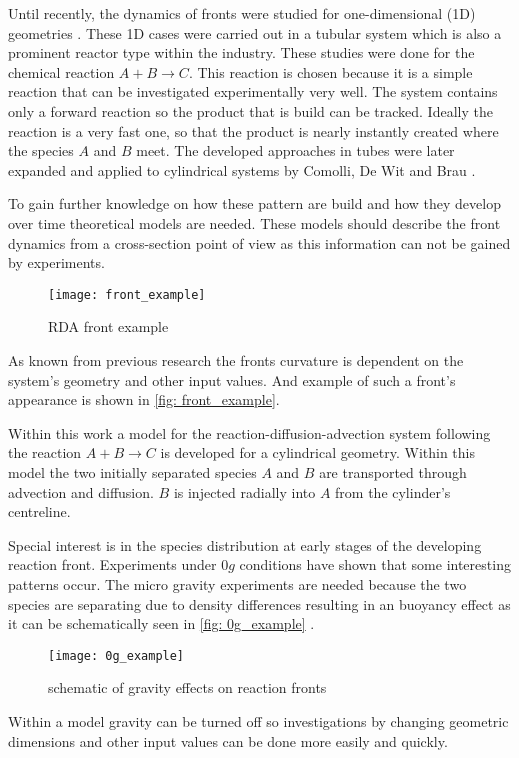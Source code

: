 \documentclass[../thesis.tex]{subfiles}
\begin{document}
Until recently, the dynamics of fronts were studied for one-dimensional (1D) geometries \cite{PhysRevA.38.3151}. These 1D cases were carried out in a tubular system which is also a prominent reactor type within the industry. These studies were done for the chemical reaction $ A+B \rightarrow C$. This reaction is chosen because it is a simple reaction that can be investigated experimentally very well. The system contains only a forward reaction so the product that is build can be tracked. Ideally the reaction is a very fast one, so that the product is nearly instantly created where the species $A$ and $B$ meet. The developed approaches in tubes were later expanded and applied to cylindrical systems by Comolli, De Wit and Brau \cite{comolli2021dynamics}.

To gain further knowledge on how these pattern are build and how they develop over time theoretical models are needed. These models should describe the front dynamics from a cross-section point of view as this information can not be gained by experiments. 
\begin{figure}[htbp]
	\centering
	\texttt{[image: front\_example]}
	\caption{RDA front example}
	\label{fig: front_example}
\end{figure}
As known from previous research the fronts curvature is dependent on the system's geometry and other input values. And example of such a front's appearance is shown in \autoref{fig: front_example}.

Within this work a model for the reaction-diffusion-advection system following the reaction $ A+B \rightarrow C$ is developed for a cylindrical geometry. Within this model the two initially separated species $A$ and $B$ are transported through advection and diffusion. $B$ is injected radially into $A$ from the cylinder's centreline. 

Special interest is in the species distribution at early stages of the developing reaction front. Experiments under $0g$ conditions have shown that some interesting patterns occur. The micro gravity experiments are needed because the two species are separating due to density differences resulting in an buoyancy effect as it can be schematically seen in \autoref{fig: 0g_example} \cite{stergiou2022effects}.
\begin{figure}[htbp]
	\centering
	\texttt{[image: 0g\_example]}
	\caption{schematic of gravity effects on reaction fronts}
	\label{fig: 0g_example}
\end{figure}
Within a model gravity can be turned off so investigations by changing geometric dimensions and other input values can be done more easily and quickly.
\end{document}
